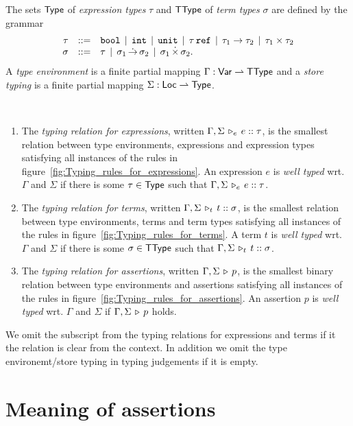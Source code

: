 \documentclass[12pt,a4paper]{article}
\newcommand{\TType}{\sstyle{TType}}
\begin{document}
\begin{definition}
  The sets $\mathsf{Type}$ of {\em expression types} $\tau$ and $\TType$ of {\em term types} $\sigma$ are defined by the
  grammar
  \[\begin{array}{rrlll}
  \tau & ::= & \mathtt{bool} \,\mid\, \mathtt{int} \,\mid\, \mathtt{unit} \,\mid\, \tau\,\mathtt{ref}
  \,\mid\, \tau_1\to\tau_2 \,\mid\, \tau_1 \times \tau_2
  \\
  \sigma & ::= & \tau \,\mid\, \sigma_1\operatorname{\dot{\to}}\sigma_2 \,\mid\, \sigma_1 \operatorname{\dot{\times}} \sigma_2.
  \end{array}\]
  A {\em type environment} is a finite partial mapping $\Gamma:\Var \pto \TType$
  and a {\em store typing} is a finite partial mapping $\Sigma:\mathsf{Loc} \rightharpoonup \mathsf{Type}$.
\end{definition}

\begin{definition} \
  \begin{enumerate}
  \item The {\em typing relation for expressions}, written $\Gamma,\Sigma\,\triangleright_e\,e\mathrel{::}\tau$, is
    the smallest relation between type environments, expressions and expression types satisfying all instances
    of the rules in figure~\ref{fig:Typing_rules_for_expressions}. An expression $e$ is {\em well typed} wrt.
    $\Gamma$ and $\Sigma$ if there is some $\tau\in\mathsf{Type}$ such that $\Gamma,\Sigma\,\triangleright_e\,e\mathrel{::}\tau$.
  \item The {\em typing relation for terms}, written $\Gamma,\Sigma\,\triangleright_t\,t\mathrel{::}\sigma$, is
    the smallest relation between type environments, terms and term types satisfying all instances
    of the rules in figure~\ref{fig:Typing_rules_for_terms}. A term $t$ is {\em well typed} wrt. $\Gamma$ and
    $\Sigma$ if there is some $\sigma\in\TType$ such that $\Gamma,\Sigma\,\triangleright_t\,t\mathrel{::}\sigma$.
  \item The {\em typing relation for assertions}, written $\Gamma,\Sigma\,\triangleright\,p$, is the
    smallest binary relation between type environments and assertions satisfying all instances
    of the rules in figure~\ref{fig:Typing_rules_for_assertions}. An assertion $p$ is {\em well typed} wrt.
    $\Gamma$ and $\Sigma$ if $\Gamma,\Sigma\,\triangleright\,p$ holds.
  \end{enumerate}
\end{definition}

We omit the subscript from the typing relations for expressions and terms if it the relation is clear from the context.
In addition we omit the type environemt/store typing in typing judgements if it is empty.

\section{Meaning of assertions}
\end{document}
